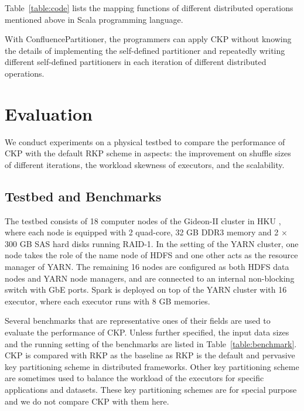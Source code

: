 \documentclass[10pt,journal,compsoc]{IEEEtran}
\begin{document}
Table~\ref{table:code} lists the mapping functions of different distributed operations mentioned above in Scala programming language.



With ConfluencePartitioner, the programmers can apply CKP without knowing the details of implementing the self-defined partitioner and repeatedly writing different self-defined partitioners in each iteration of different distributed operations.


\section{Evaluation}\label{section:evaluation}
We conduct experiments on a physical testbed to compare the performance of CKP with the default RKP scheme in aspects: the improvement on shuffle sizes of different iterations, the workload skewness of executors, and the scalability. 


\subsection{Testbed and Benchmarks}
The testbed consists of 18 computer nodes of the Gideon-II cluster in HKU \cite{gideon}, where each node is equipped with 2 quad-core, 32 GB DDR3 memory and 2 $\times$ 300 GB SAS hard disks running RAID-1. 
In the setting of the YARN cluster, one node takes the role of  the name node of HDFS and one other acts as the resource manager of YARN. The remaining 16 nodes are configured as both HDFS data nodes and YARN node managers, and are connected to an internal non-blocking switch with GbE ports.
Spark is deployed on top of the YARN cluster with 16 executor, where each executor runs with 8 GB memories. 

Several benchmarks that are representative ones of their fields are used to evaluate the performance of CKP.
Unless further specified, the input data sizes and the running setting of the benchmarks are listed in Table~\ref{table:benchmark}.
CKP is compared with RKP as the baseline as RKP is the default and pervasive key partitioning scheme in distributed frameworks. 
Other key partitioning scheme are sometimes used to balance the workload of the executors for specific applications and datasets. 
These key partitioning schemes are for special purpose and we do not compare CKP with them here. 
\end{document}
